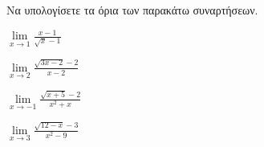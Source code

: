 Να υπολογίσετε τα όρια των παρακάτω συναρτήσεων.
\begin{multicols}{2}
\begin{alist}
\item $ \lim\limits_{x\to 1}\frac{x-1}{\sqrt{x}-1} $
\item $ \lim\limits_{x\to 2}\frac{\sqrt{3x-2}-2}{x-2} $
\item $ \lim\limits_{x\to-1}\frac{\sqrt{x+5}-2}{x^2+x} $
\item $ \lim\limits_{x\to 3}{\frac{\sqrt{12-x}-3}{x^2-9}} $
\end{alist}
\end{multicols}
